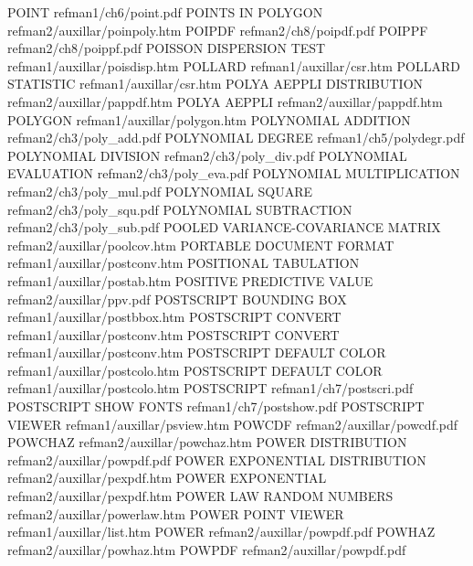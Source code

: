 POINT                                   refman1/ch6/point.pdf
POINTS IN POLYGON                       refman2/auxillar/poinpoly.htm
POIPDF                                  refman2/ch8/poipdf.pdf
POIPPF                                  refman2/ch8/poippf.pdf
POISSON DISPERSION TEST                 refman1/auxillar/poisdisp.htm
POLLARD                                 refman1/auxillar/csr.htm
POLLARD STATISTIC                       refman1/auxillar/csr.htm
POLYA AEPPLI DISTRIBUTION               refman2/auxillar/pappdf.htm
POLYA AEPPLI                            refman2/auxillar/pappdf.htm
POLYGON                                 refman1/auxillar/polygon.htm
POLYNOMIAL ADDITION                     refman2/ch3/poly_add.pdf
POLYNOMIAL DEGREE                       refman1/ch5/polydegr.pdf
POLYNOMIAL DIVISION                     refman2/ch3/poly_div.pdf
POLYNOMIAL EVALUATION                   refman2/ch3/poly_eva.pdf
POLYNOMIAL MULTIPLICATION               refman2/ch3/poly_mul.pdf
POLYNOMIAL SQUARE                       refman2/ch3/poly_squ.pdf
POLYNOMIAL SUBTRACTION                  refman2/ch3/poly_sub.pdf
POOLED VARIANCE-COVARIANCE MATRIX       refman2/auxillar/poolcov.htm
PORTABLE DOCUMENT FORMAT                refman1/auxillar/postconv.htm
POSITIONAL TABULATION                   refman1/auxillar/postab.htm
POSITIVE PREDICTIVE VALUE               refman2/auxillar/ppv.pdf
POSTSCRIPT BOUNDING BOX                 refman1/auxillar/postbbox.htm
POSTSCRIPT CONVERT                      refman1/auxillar/postconv.htm
POSTSCRIPT CONVERT                      refman1/auxillar/postconv.htm
POSTSCRIPT DEFAULT COLOR                refman1/auxillar/postcolo.htm
POSTSCRIPT DEFAULT COLOR                refman1/auxillar/postcolo.htm
POSTSCRIPT                              refman1/ch7/postscri.pdf
POSTSCRIPT SHOW FONTS                   refman1/ch7/postshow.pdf
POSTSCRIPT VIEWER                       refman1/auxillar/psview.htm
POWCDF                                  refman2/auxillar/powcdf.pdf
POWCHAZ                                 refman2/auxillar/powchaz.htm
POWER DISTRIBUTION                      refman2/auxillar/powpdf.pdf
POWER EXPONENTIAL DISTRIBUTION          refman2/auxillar/pexpdf.htm
POWER EXPONENTIAL                       refman2/auxillar/pexpdf.htm
POWER LAW RANDOM NUMBERS                refman2/auxillar/powerlaw.htm
POWER POINT VIEWER                      refman1/auxillar/list.htm
POWER                                   refman2/auxillar/powpdf.pdf
POWHAZ                                  refman2/auxillar/powhaz.htm
POWPDF                                  refman2/auxillar/powpdf.pdf
